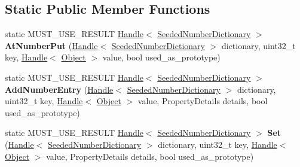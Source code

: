 \subsection*{Static Public Member Functions}
\begin{DoxyCompactItemize}
\item 
static M\+U\+S\+T\+\_\+\+U\+S\+E\+\_\+\+R\+E\+S\+U\+LT \hyperlink{classv8_1_1internal_1_1_handle}{Handle}$<$ \hyperlink{classv8_1_1internal_1_1_seeded_number_dictionary}{Seeded\+Number\+Dictionary} $>$ {\bfseries At\+Number\+Put} (\hyperlink{classv8_1_1internal_1_1_handle}{Handle}$<$ \hyperlink{classv8_1_1internal_1_1_seeded_number_dictionary}{Seeded\+Number\+Dictionary} $>$ dictionary, uint32\+\_\+t key, \hyperlink{classv8_1_1internal_1_1_handle}{Handle}$<$ \hyperlink{classv8_1_1internal_1_1_object}{Object} $>$ value, bool used\+\_\+as\+\_\+prototype)\hypertarget{classv8_1_1internal_1_1_seeded_number_dictionary_a3cae865a688434359c94317255703257}{}\label{classv8_1_1internal_1_1_seeded_number_dictionary_a3cae865a688434359c94317255703257}

\item 
static M\+U\+S\+T\+\_\+\+U\+S\+E\+\_\+\+R\+E\+S\+U\+LT \hyperlink{classv8_1_1internal_1_1_handle}{Handle}$<$ \hyperlink{classv8_1_1internal_1_1_seeded_number_dictionary}{Seeded\+Number\+Dictionary} $>$ {\bfseries Add\+Number\+Entry} (\hyperlink{classv8_1_1internal_1_1_handle}{Handle}$<$ \hyperlink{classv8_1_1internal_1_1_seeded_number_dictionary}{Seeded\+Number\+Dictionary} $>$ dictionary, uint32\+\_\+t key, \hyperlink{classv8_1_1internal_1_1_handle}{Handle}$<$ \hyperlink{classv8_1_1internal_1_1_object}{Object} $>$ value, Property\+Details details, bool used\+\_\+as\+\_\+prototype)\hypertarget{classv8_1_1internal_1_1_seeded_number_dictionary_a5efae5f0c1851cf3ecb4dd4869a584a9}{}\label{classv8_1_1internal_1_1_seeded_number_dictionary_a5efae5f0c1851cf3ecb4dd4869a584a9}

\item 
static M\+U\+S\+T\+\_\+\+U\+S\+E\+\_\+\+R\+E\+S\+U\+LT \hyperlink{classv8_1_1internal_1_1_handle}{Handle}$<$ \hyperlink{classv8_1_1internal_1_1_seeded_number_dictionary}{Seeded\+Number\+Dictionary} $>$ {\bfseries Set} (\hyperlink{classv8_1_1internal_1_1_handle}{Handle}$<$ \hyperlink{classv8_1_1internal_1_1_seeded_number_dictionary}{Seeded\+Number\+Dictionary} $>$ dictionary, uint32\+\_\+t key, \hyperlink{classv8_1_1internal_1_1_handle}{Handle}$<$ \hyperlink{classv8_1_1internal_1_1_object}{Object} $>$ value, Property\+Details details, bool used\+\_\+as\+\_\+prototype)\hypertarget{classv8_1_1internal_1_1_seeded_number_dictionary_ab90f1fe5024ae8cc41cb504b02dff937}{}\label{classv8_1_1internal_1_1_seeded_number_dictionary_ab90f1fe5024ae8cc41cb504b02dff937}

\end{DoxyCompactItemize}
